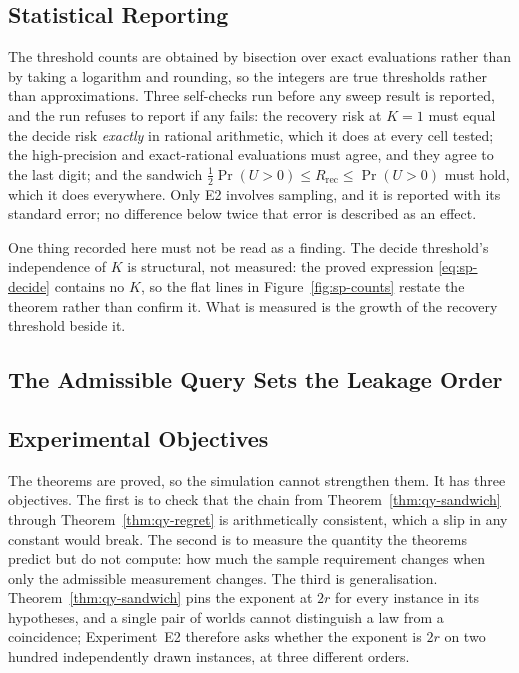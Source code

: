 \subsection{Statistical Reporting}

The threshold counts are obtained by bisection over exact evaluations rather than by taking a
logarithm and rounding, so the integers are true thresholds rather than approximations. Three
self-checks run before any sweep result is reported, and the run refuses to report if any
fails: the recovery risk at $K=1$ must equal the decide risk \emph{exactly} in rational
arithmetic, which it does at every cell tested; the high-precision and exact-rational
evaluations must agree, and they agree to the last digit; and the sandwich
$\tfrac12\Pr(U>0)\le R_{\mathrm{rec}}\le\Pr(U>0)$ must hold, which it does everywhere. Only
E2 involves sampling, and it is reported with its standard error; no difference below twice
that error is described as an effect.

One thing recorded here must not be read as a finding. The decide threshold's independence of
$K$ is structural, not measured: the proved expression \eqref{eq:sp-decide} contains no $K$, so
the flat lines in Figure~\ref{fig:sp-counts} restate the theorem rather than confirm it. What is
measured is the growth of the recovery threshold beside it.


\subsection{The Admissible Query Sets the Leakage Order}
\label{sec:qy-expdesign}

\subsection{Experimental Objectives}

The theorems are proved, so the simulation cannot strengthen them. It has three objectives.
The first is to check that the chain from Theorem~\ref{thm:qy-sandwich} through
Theorem~\ref{thm:qy-regret} is arithmetically consistent, which a slip in any constant would
break. The second is to measure the quantity the theorems predict but do not compute: how
much the sample requirement changes when only the admissible measurement changes. The third
is generalisation. Theorem~\ref{thm:qy-sandwich} pins the exponent at $2r$ for every instance in
its hypotheses, and a single pair of worlds cannot distinguish a law from a coincidence;
Experiment~E2 therefore asks whether the exponent is $2r$ on two hundred independently drawn
instances, at three different orders.

